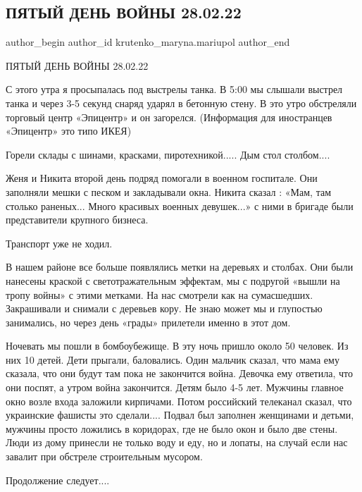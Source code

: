  
 
 
 
 

\subsection{ПЯТЫЙ ДЕНЬ ВОЙНЫ 28.02.22}
\label{sec:28_02_2023.fb.krutenko_maryna.mariupol.1.pyatii_den_voini_28_}

\ifcmt
 author_begin
   author_id krutenko_maryna.mariupol
 author_end
\fi

ПЯТЫЙ ДЕНЬ ВОЙНЫ 28.02.22

С этого утра я просыпалась под выстрелы танка. В 5:00 мы слышали выстрел танка
и через 3-5 секунд снаряд ударял в бетонную стену. В это утро обстреляли
торговый центр «Эпицентр» и он загорелся. (Информация для иностранцев
«Эпицентр» это типо ИКЕЯ) 

Горели склады с шинами, красками, пиротехникой..... Дым стол столбом....

Женя и Никита второй день подряд помогали в военном госпитале. Они заполняли
мешки с песком и закладывали окна. Никита сказал : «Мам, там столько раненых...
Много красивых военных девушек...» с ними в бригаде были представители крупного
бизнеса. 

Транспорт уже не ходил.

В нашем районе все больше появлялись метки на деревьях и столбах. Они были
нанесены краской с светотражательным эффектам, мы с подругой «вышли на тропу
войны» с этими метками. На нас смотрели как на сумасшедших. Закрашивали и
снимали с деревьев кору. Не знаю может мы и глупостью занимались, но через день
«грады» прилетели именно в этот дом. 

Ночевать мы пошли в бомбоубежище. В эту ночь пришло около 50 человек. Из них 10
детей. Дети прыгали, баловались. Один мальчик сказал, что мама ему сказала, что
они будут там пока не закончится война. Девочка ему ответила, что они поспят, а
утром война закончится. Детям было 4-5 лет. Мужчины главное окно возле входа
заложили кирпичами. Потом российский телеканал сказал, что украинские фашисты
это сделали.... Подвал был заполнен женщинами и детьми, мужчины просто ложились в
коридорах, где не было окон и было две стены. Люди из дому принесли не только
воду и еду, но и лопаты, на случай если нас завалит при обстреле строительным
мусором. 

Продолжение следует....
